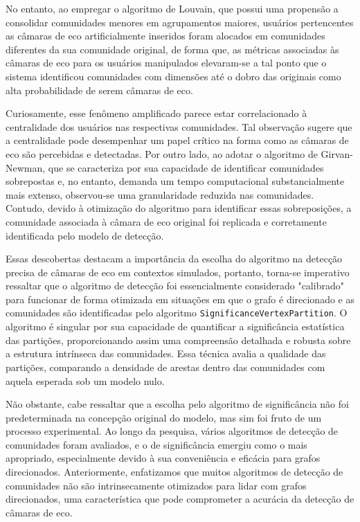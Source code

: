 No entanto, ao empregar o algoritmo de Louvain, que possui uma propensão a consolidar comunidades menores em agrupamentos maiores, usuários pertencentes as câmaras de eco artificialmente inseridos foram alocados em comunidades diferentes da sua comunidade original, de forma que, as métricas associadas às câmaras de eco para os usuários manipulados elevaram-se a tal ponto que o sistema identificou comunidades com dimensões até o dobro das originais como alta probabilidade de serem câmaras de eco.

Curiosamente, esse fenômeno amplificado parece estar correlacionado à centralidade dos usuários nas respectivas comunidades. Tal observação sugere que a centralidade pode desempenhar um papel crítico na forma como as câmaras de eco são percebidas e detectadas. Por outro lado, ao adotar o algoritmo de Girvan-Newman, que se caracteriza por sua capacidade de identificar comunidades sobrepostas e, no entanto, demanda um tempo computacional substancialmente mais extenso, observou-se uma granularidade reduzida nas comunidades. Contudo, devido à otimização do algoritmo para identificar essas sobreposições, a comunidade associada à câmara de eco original foi replicada e corretamente identificada pelo modelo de detecção.

Essas descobertas destacam a importância da escolha do algoritmo na detecção precisa de câmaras de eco em contextos simulados, portanto, torna-se imperativo ressaltar que o algoritmo de detecção foi essencialmente considerado "calibrado" para funcionar de forma otimizada em situações em que o grafo é direcionado e as comunidades são identificadas pelo algoritmo \texttt{SignificanceVertexPartition}. O algoritmo é singular por sua capacidade de quantificar a significância estatística das partições, proporcionando assim uma compreensão detalhada e robusta sobre a estrutura intrínseca das comunidades. Essa técnica avalia a qualidade das partições, comparando a densidade de arestas dentro das comunidades com aquela esperada sob um modelo nulo.

Não obstante, cabe ressaltar que a escolha pelo algoritmo de significância não foi predeterminada na concepção original do modelo, mas sim foi fruto de um processo experimental. Ao longo da pesquisa, vários algoritmos de detecção de comunidades foram avaliados, e o de significância emergiu como o mais apropriado, especialmente devido à sua conveniência e eficácia para grafos direcionados. Anteriormente, enfatizamos que muitos algoritmos de detecção de comunidades não são intrinsecamente otimizados para lidar com grafos direcionados, uma característica que pode comprometer a acurácia da detecção de câmaras de eco.

